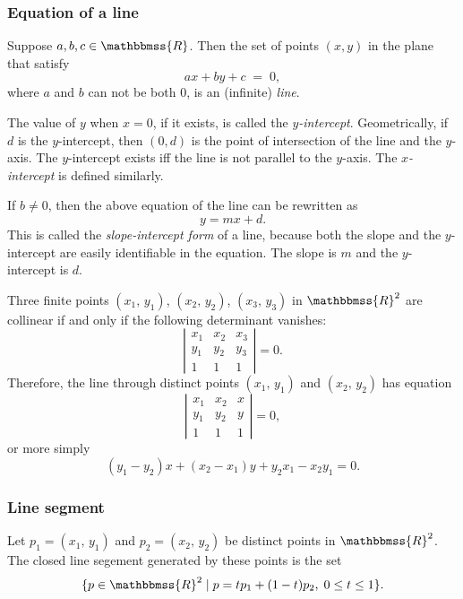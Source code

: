 \documentclass[12pt]{article}
\newcommand{\R}{\mathbbmss{R}}
\begin{document}
\subsubsection*{Equation of a line}
Suppose $a,b,c\in \R$. Then the set of points $(x,y)$ in the 
plane that satisf{y}
$$
   ax+by+c \;=\; 0,
$$
where $a$ and $b$ can not be both 0, is an (infinite) \emph{line}.

The value of $y$ when $x=0$, if it exists, is called the \emph{$y$-intercept}.  Geometrically, if $d$ is the $y$-intercept, then $(0,d)$ is the point of intersection of the line and the $y$-axis.  The $y$-intercept exists iff the line is not parallel to the $y$-axis.  The \emph{$x$-intercept} is defined similarly.

If $b\neq0$, then the above equation of the line can be rewritten as
$$
   y = mx + d.
$$
This is called the \emph{slope-intercept form} of a line, because both the slope and the $y$-intercept are easily identifiable in the equation.  The slope is $m$ and the $y$-intercept is $d$.

Three finite points $(x_1,\,y_1)$, $(x_2,\,y_2)$, $(x_3,\,y_3)$ in $\R^2$ are collinear if and only if the following determinant vanishes:
$$\left| \begin{array}{ccc} x_1 & x_2 &x_3 \\ y_1 & y_2 & y_3 \\ 1 & 1& 1\end{array} \right|=0.$$
Therefore, the line through distinct points $(x_1,\,y_1)$ and $(x_2,\,y_2)$ has equation 
$$\left| \begin{array}{ccc} x_1 & x_2 &x \\ y_1 & y_2 & y \\ 1 & 1& 1\end{array} \right|=0,$$ 
or more simply
$$
   (y_1-y_2)x+(x_2 - x_1)y + y_2 x_1-x_2 y_1=0.
$$

\subsubsection*{Line segment}

Let $p_1 = (x_1,\,y_1)$ and $p_2 = (x_2,\,y_2)$ be distinct points in $\R^2$.  The closed line segement generated by these points is the set
$$\{ p\in \R^2 \mid   p=t p_1+(1-t) p_2,\; 0\leq t\leq 1\}.$$
\end{document}
